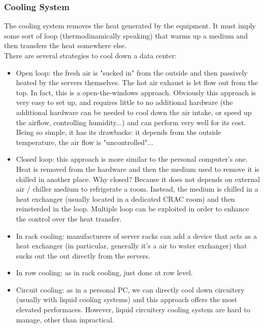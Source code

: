 \documentclass[10pt,a4paper]{article}
\begin{document}
				\subsubsection{Cooling System}
					The cooling system removes the heat generated by the equipment. It must imply some sort of loop (thermodinamically speaking) that warms up a medium and then transfers the heat somewhere else.\\
					There are several strategies to cool down a data center:
					\begin{itemize}
						\item Open loop: the fresh air is "sucked in" from the outside and then passively heated by the servers themselves. The hot air exhaust is let flow out from the top. In fact, this is a open-the-windows approach. Obviously this approach is very easy to set up, and requires little to no additional hardware (the additional hardware can be needed to cool down the air intake, or speed up the airflow, controlling humidity...) and can perform very well for its cost. Being so simple, it has its drawbacks: it depends from the outside temperature, the air flow is "uncontrolled"...
						\item Closed loop: this approach is more similar to the personal computer's one. Heat is removed from the hardware and then the medium used to remove it is chilled in another place. Why closed? Because it does not depends on external air / chiller medium to refrigerate a room. Instead, the medium is chilled in a heat exchanger (usually located in a dedicated CRAC room) and then reinsterded in the loop. Multiple loop can be exploited in order to enhance the control over the heat transfer.
						\item In rack cooling: manufacturers of server racks can add a device that acts as a heat exchanger (in particular, generally it's a air to water exchanger) that sucks out the out directly from the servers.
						\item In row cooling: as in rack cooling, just done at row level.
						\item Circuit cooling: as in a personal PC, we can directly cool down circuitery (usually with liquid cooling systems) and this approach offers the most elevated performaces. However, liquid circuitery cooling system are hard to manage, other than inpractical.
					\end{itemize}
					
\end{document}
